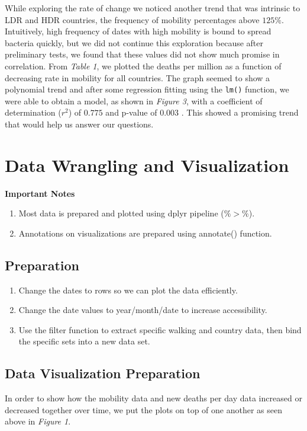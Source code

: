 \documentclass[11pt, english]{article}
\begin{document}
While exploring the rate of change we noticed another trend that was intrinsic to LDR and HDR countries, the frequency of mobility percentages above $125\%$. Intuitively, high frequency of dates with high mobility is bound to spread bacteria quickly,  but we did not continue this exploration because after preliminary tests, we found that these values did not show much promise in correlation. From \textit{Table 1}, we plotted the deaths per million as a function of decreasing rate in mobility for all countries. The graph seemed to show a polynomial trend and after some regression fitting using the \texttt{lm()} function, we were able to obtain a model, as shown in \textit{Figure 3}, with a coefficient of determination ($r^2$) of $0.775$ and p-value of $0.003$ . This showed a promising trend that would help us answer our questions.
\clearpage
\section{Data Wrangling and Visualization}
\textbf{Important Notes}
\begin{enumerate}
    \item Most data is prepared and plotted using dplyr pipeline ($\%>\%$).
    \item Annotations on visualizations are prepared using annotate() function.
\end{enumerate}

\subsection{Preparation}
\begin{enumerate}
    \item Change the dates to rows so we can plot the data efficiently.
    \item Change the date values to year/month/date to increase accessibility.
    \item Use the filter function to extract specific walking and country data, then bind the specific sets into a new data set. 
\end{enumerate}

\subsection{Data Visualization Preparation}
In order to show how the mobility data and new deaths per day data increased or decreased together over time, we put the plots on top of one another as seen above in \textit{Figure 1}. 
\end{document}
